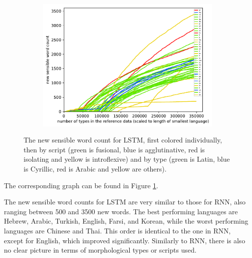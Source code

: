 \documentclass[11pt,a4paper,twoside,openright]{scrbook}
\begin{document}
\begin{figure}[h]
\begin{subfigure}[b]{0.32\textwidth}
        \includegraphics[width=\textwidth]{graphs/lstm/scripts/norm_huge_type_type_performance}
    \end{subfigure}
    \caption{The new sensible word count for LSTM, first colored individually, then by script (green is fusional, blue is agglutinative, red is isolating and yellow is introflexive) and by type (green is Latin, blue is Cyrillic, red is Arabic and yellow are others).}
	\label{Figure:lstm_norm_huge_type_type_performance}
\end{figure}

The corresponding graph can be found in Figure \ref{Figure:lstm_norm_huge_type_type_performance}.

The new sensible word counts for LSTM are very similar to those for RNN, also ranging between 500 and 3500 new words. The best performing languages are Hebrew, Arabic, Turkish, English, Farsi, and Korean, while the worst performing languages are Chinese and Thai. This order is identical to the one in RNN, except for English, which improved significantly. Similarly to RNN, there is also no clear picture in terms of morphological types or scripts used. 
\end{document}
